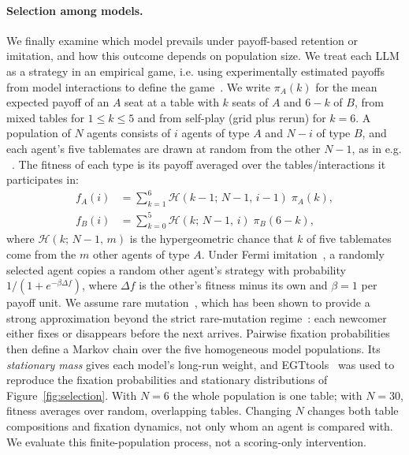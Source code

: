 \documentclass[sigconf,anonymous]{aamas}
\begin{document}
\paragraph{Selection among models.}
We finally examine which model prevails under payoff-based retention or imitation, and how this outcome depends on population size. We treat each LLM as a strategy in an empirical game, i.e. using experimentally estimated payoffs from model interactions to define the game~\cite{wellman2006methods,tuyls2018generalised}. We write $\pi_A(k)$ for the mean expected payoff of an $A$ seat at a table with $k$ seats of $A$ and $6-k$ of $B$, from mixed tables for $1\le k\le5$ and from self-play (grid plus rerun) for $k=6$. A population of $N$ agents consists of $i$ agents of type $A$ and $N-i$ of type $B$, and each agent's five tablemates are drawn at random from the other $N-1$, as in e.g. ~\cite{santos2011risk,han2017evolution,santos2020picky}. The fitness of each type is its payoff averaged over the tables/interactions it participates in:
\begin{align}
f_A(i) &= \textstyle\sum_{k=1}^{6} \mathcal{H}(k-1;\,N-1,\,i-1)\;\pi_A(k), \label{eq:fitness}\\
f_B(i) &= \textstyle\sum_{k=0}^{5} \mathcal{H}(k;\,N-1,\,i)\;\pi_B(6-k), \nonumber
\end{align}
where $\mathcal{H}(k;\,N-1,\,m)$ is the hypergeometric chance that $k$ of five tablemates come from the $m$ other agents of type $A$. Under Fermi imitation~\cite{traulsen2006stochastic,han2017evolution}, a randomly selected agent copies a random other agent's strategy with probability $1/(1+e^{-\beta\Delta f})$, where $\Delta f$ is the other's fitness minus its own and $\beta=1$ per payoff unit. We assume rare mutation~\cite{fudenberg2006imitation,han2017evolution}, which has been shown to provide a strong approximation beyond the strict rare-mutation regime~\cite{han2012emergence,rand2013evolution,zisis2015generosity,sigmund2010social}: each newcomer either fixes or disappears before the next arrives. Pairwise fixation probabilities then define a Markov chain over the five homogeneous model populations.  Its \emph{stationary mass} gives each model's long-run weight, and EGTtools~\cite{fernandezdomingos2023egttools} was used to reproduce the fixation probabilities and stationary distributions of Figure~\ref{fig:selection}. With $N=6$ the whole population is one table; with $N=30$, fitness averages over random, overlapping tables. Changing $N$ changes both table compositions and fixation dynamics, not only whom an agent is compared with. We evaluate this finite-population process, not a scoring-only intervention.
\end{document}
